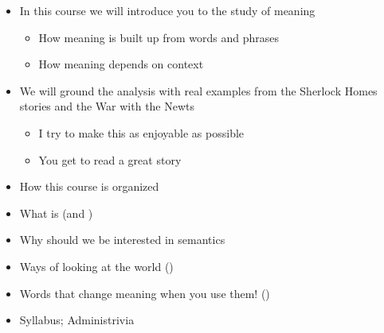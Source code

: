 \documentclass[a4paper,landscape,headrule,footrule,xetex,25pt]{foils}
\begin{document}
\maketitle

%




\begin{itemize}
\item In this course we will introduce you to the study of meaning
  \begin{itemize}
  \item How meaning is built up from words and phrases
  \item How meaning depends on context
  \end{itemize}
\item We will ground the analysis with real examples from the Sherlock Homes stories and the War with the Newts
  \begin{itemize}
  \item I try to make this as enjoyable as possible
  \item You get to read  a great story
  \end{itemize}
\end{itemize}



\begin{itemize}
\item How this course is organized
\item What is  (and )
\item Why should we be interested in semantics
\item Ways of looking at the world ()
\item Words that change meaning when you use them! ()
\item Syllabus; Administrivia
\end{itemize}




\end{document}
